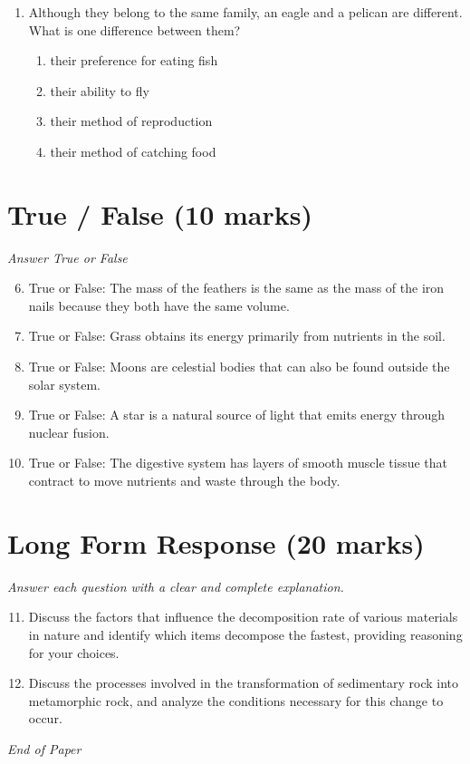 \documentclass[12pt]{article}
\begin{document}
\begin{enumerate}[label=\arabic*.]
\begin{enumerate}[label=(\alph*)]
    \item changing rates of erosion.
    \item evaporation of sea water.
\end{enumerate}
\item Although they belong to the same family, an eagle and a pelican are different. What is one difference between them?
\begin{enumerate}[label=(\alph*)]
    \item their preference for eating fish
    \item their ability to fly
    \item their method of reproduction
    \item their method of catching food
\end{enumerate}
\end{enumerate}

\section*{True / False (10 marks)}
\textit{Answer True or False}
\begin{enumerate}[label=\arabic*.]
\setcounter{enumi}{5}
\item True or False: The mass of the feathers is the same as the mass of the iron nails because they both have the same volume.
\item True or False: Grass obtains its energy primarily from nutrients in the soil.
\item True or False: Moons are celestial bodies that can also be found outside the solar system.
\item True or False: A star is a natural source of light that emits energy through nuclear fusion.
\item True or False: The digestive system has layers of smooth muscle tissue that contract to move nutrients and waste through the body.
\end{enumerate}

\section*{Long Form Response (20 marks)}
\textit{Answer each question with a clear and complete explanation.}
\begin{enumerate}[label=\arabic*.]
\setcounter{enumi}{10}
\item Discuss the factors that influence the decomposition rate of various materials in nature and identify which items decompose the fastest, providing reasoning for your choices.
\item Discuss the processes involved in the transformation of sedimentary rock into metamorphic rock, and analyze the conditions necessary for this change to occur.
\end{enumerate}

\vfill
\noindent\textit{End of Paper}
\end{document}
